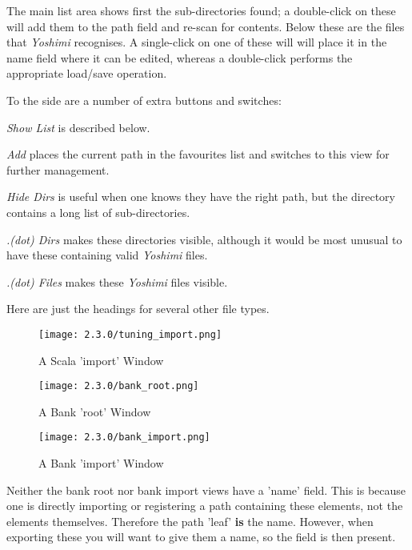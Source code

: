    The main list area shows first the sub-directories found; a double-click
   on these will add them to the path field and re-scan for contents. Below
   these are the files that \textsl{Yoshimi} recognises. A single-click on
   one of these will will place it in the name field where it can be edited,
   whereas a double-click performs the appropriate load/save operation.

   To the side are a number of extra buttons and switches:

   \textsl{Show List} is described below.

   \textsl{Add} places the current path in the favourites list and switches to
   this view for further management.

   \textsl{Hide Dirs} is useful when one knows they have the right path, but the
   directory contains a long list of sub-directories.

   \textsl{.(dot) Dirs} makes these directories visible, although it would be most
   unusual to have these containing valid \textsl{Yoshimi} files.

   \textsl{.(dot) Files} makes these \textsl{Yoshimi} files visible.

   Here are just the headings for several other file types.

   \begin{figure}[H]
      \centering
      \texttt{[image: 2.3.0/tuning\_import.png]}
      \caption{A Scala 'import' Window}
   \end{figure}

   \begin{figure}[H]
      \centering
      \texttt{[image: 2.3.0/bank\_root.png]}
      \caption{A Bank 'root' Window}
      \label{fig:filer_bank_root_window}
   \end{figure}

   \begin{figure}[H]
      \centering
      \texttt{[image: 2.3.0/bank\_import.png]}
      \caption{A Bank 'import' Window}
      \label{fig:filer_bank_import_window}
   \end{figure}

   Neither the bank root nor bank import views have a 'name' field. This is
   because one is directly importing or registering a path containing these
   elements, not the elements themselves. Therefore the path 'leaf' \textbf{is}
   the name. However, when exporting these you will want to give them a name, so
   the field is then present.

